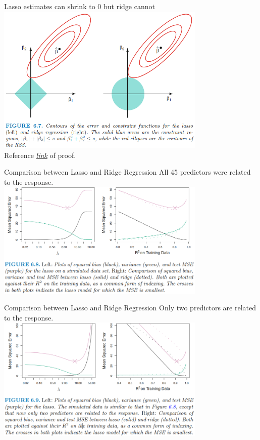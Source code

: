 \documentclass{beamer}
\begin{document}
	\begin{frame}{Lasso estimates can shrink to 0 but ridge cannot }
		\includegraphics[width=10cm]{figure_6.7.png} \\
		\vspace{0.1cm}
		Reference \hyperlink{https://stats.stackexchange.com/questions/225319/is-there-a-mathematical-expression-that-shows-how-lasso-shrinks-coefficients-in}{\textit{link}} of proof.
	\end{frame}
	
	\begin{frame}{Comparison between Lasso and Ridge Regression}
		All 45 predictors were related to the response. \\
		\vspace{0.5cm}
		\includegraphics[width=10cm]{figure_6.8.png}
	\end{frame}
	
	\begin{frame}{Comparison between Lasso and Ridge Regression}
		Only two predictors are related to the response. \\
		\vspace{0.5cm}
		\includegraphics[width=10cm]{figure_6.9.png}
	\end{frame}
	
\end{document}
